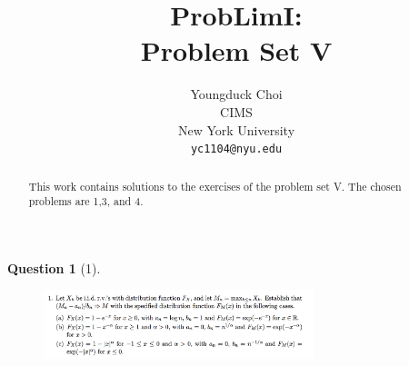 \documentclass{article} %
\title{ProbLimI: \\
Problem Set V}
\author{
Youngduck Choi \\
CIMS \\
New York University\\
\texttt{yc1104@nyu.edu} \\
}
\theoremstyle{quest}
\newtheorem*{question}{Question}
\begin{document}
\maketitle

\begin{abstract}
This work contains solutions to the exercises of the problem set V. The
chosen problems are 1,3, and 4.
\end{abstract}

\bigskip

\begin{question}[1]
\hfill
\begin{figure}[h!]
  \centering
    \includegraphics[width=0.7\textwidth]{prob-e5-p1.png}
\end{figure}
\end{question}
\end{document}

